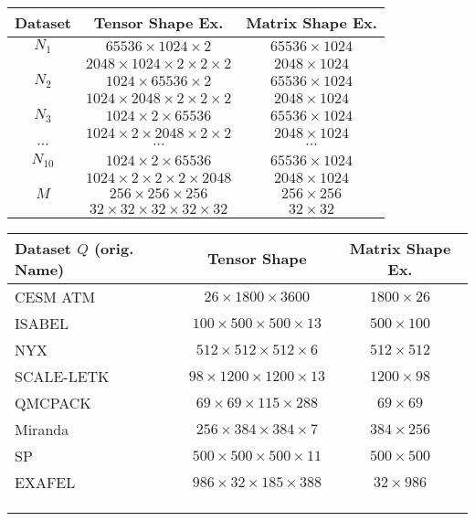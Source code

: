 \centering
\footnotesize
\begin{tabular}{ccc}
	\toprule
	Dataset    & Tensor Shape Ex.  & Matrix Shape Ex. \\ 
	\midrule
	$N_1$      & $65536\times1024\times2$               & $65536\times1024$ \\
	           & $2048\times1024\times2\times2\times2$  & $2048\times1024$ \\
	$N_2$      & $1024\times65536\times2$               & $65536\times1024$ \\
               & $1024\times2048\times2\times2\times2$  & $2048\times1024$ \\
	$N_3$      & $1024\times2\times65536$               & $65536\times1024$ \\
               & $1024\times2\times2048\times2\times2$  & $2048\times1024$ \\
    $\cdots$   & $\cdots$                               & $\cdots$ \\           
	$N_{10}$   & $1024\times2\times65536$               & $65536\times1024$ \\
               & $1024\times2\times2\times2\times2048$  & $2048\times1024$ \\
    \midrule
	$M$        & $256\times256\times256$                & $256\times256$ \\
               & $32\times32\times32\times32\times32$   & $32\times32$ \\
	\bottomrule
\end{tabular}
\hfill
\begin{tabular}{lcc}
	\toprule
	Dataset $Q$ (orig. Name)   & Tensor Shape & Matrix Shape Ex. \\ 
	\midrule
	CESM ATM   & $26\times1800\times3600$               & $1800\times26$ \\
	ISABEL     & $100\times 500\times 500\times 13$     & $500\times100$ \\
	NYX        & $512\times 512\times 512\times  6$     & $512\times512$ \\
	SCALE-LETK & $98\times1200\times1200\times 13$      & $1200\times98$ \\
	QMCPACK    & $69\times  69\times 115\times288$      & $69\times69$ \\
	Miranda    & $256\times 384\times 384\times  7$     & $384\times256$ \\
	SP         & $500\times 500\times 500\times 11$     & $500\times500$ \\
	EXAFEL     &  $986\times  32\times 185\times388$    & $32\times986$ \\
	           &&\\
	           &&\\
	           &&\\
	\midrule 
	\bottomrule
\end{tabular}